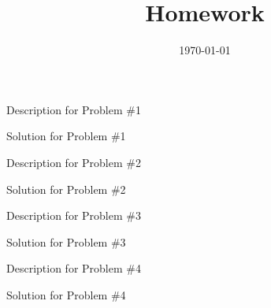 \documentclass[11pt]{article}
\title{Homework \hwnumber} %
\author{\myname} %
\date{\textbf{\mycourse} \hfill {\today} \hfill \textbf{\semesteryear}} %
\begin{document}
\thispagestyle{empty} %

\clearpage %
\maketitle


\begin{problem}{1}
Description for Problem \#1
\end{problem}

\begin{solution}
Solution for Problem \#1
\end{solution}

\vspace*{0.5cm} %

\begin{problem}{2}
Description for Problem \#2
\end{problem}

\begin{solution}
Solution for Problem \#2
\end{solution}

\vspace*{0.5cm}

\begin{problem}{3}
Description for Problem \#3

\end{problem}

\begin{solution}
Solution for Problem \#3
\end{solution}

\vspace*{0.5cm}

\begin{problem}{4}
Description for Problem \#4
\end{problem}

\begin{solution}
Solution for Problem \#4
\end{solution}
\end{document}
